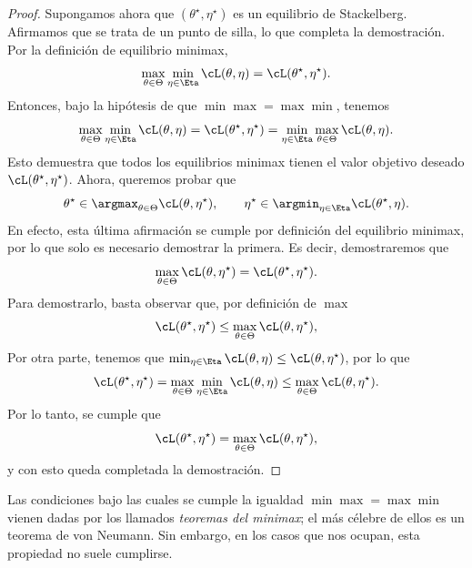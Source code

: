 \documentclass[../../book-main_es.tex]{subfiles}
\begin{document}
\begin{proof}
    Supongamos ahora que \((\theta^{\star}, \eta^{\star})\) es un equilibrio de Stackelberg.
    Afirmamos que se trata de un punto de silla, lo que completa
    la demostración. Por la definición de equilibrio minimax,
    \begin{equation}
        \max_{\theta \in \Theta}\min_{\eta \in \Eta}\cL(\theta, \eta)
        = \cL(\theta^{\star}, \eta^{\star}).
    \end{equation}
    Entonces, bajo la hipótesis de que \(\min\max = \max\min\), tenemos
    \begin{equation}
        \max_{\theta \in \Theta}\min_{\eta \in \Eta}\cL(\theta, \eta)
        = \cL(\theta^{\star}, \eta^{\star}) = \min_{\eta \in
        \Eta}\max_{\theta \in \Theta}\cL(\theta, \eta).
    \end{equation}
    Esto demuestra que todos los equilibrios minimax tienen el valor objetivo deseado
    \(\cL(\theta^{\star}, \eta^{\star})\). Ahora, queremos
    probar que
    \begin{equation}
        \theta^{\star} \in \argmax_{\theta \in \Theta}\cL(\theta,
        \eta^{\star}), \qquad \eta^{\star} \in \argmin_{\eta \in
        \Eta}\cL(\theta^{\star}, \eta).
    \end{equation}
    En efecto, esta última afirmación se cumple por definición del equilibrio minimax,
    por lo que solo es necesario demostrar la primera. Es decir, demostraremos que
    \begin{equation}
        \max_{\theta \in \Theta}\cL(\theta, \eta^{\star}) =
        \cL(\theta^{\star}, \eta^{\star}).
    \end{equation}
    Para demostrarlo, basta observar que, por definición de \(\max\)
    \begin{equation}
        \cL(\theta^{\star}, \eta^{\star}) \leq \max_{\theta \in
        \Theta}\cL(\theta, \eta^{\star}),
    \end{equation}
    Por otra parte, tenemos que \(\min_{\eta \in \Eta}\cL(\theta, \eta) \leq
    \cL(\theta, \eta^{\star})\), por lo que
    \begin{equation}
        \cL(\theta^{\star}, \eta^{\star}) = \max_{\theta \in
        \Theta}\min_{\eta \in \Eta}\cL(\theta, \eta) \leq
        \max_{\theta \in \Theta}\cL(\theta, \eta^{\star}).
    \end{equation}
    Por lo tanto, se cumple que
    \begin{equation}
        \cL(\theta^{\star}, \eta^{\star}) = \max_{\theta \in
        \Theta}\cL(\theta, \eta^{\star}),
    \end{equation}
    y con esto queda completada la demostración.
\end{proof}
Las condiciones bajo las cuales se cumple la igualdad \(\min\max = \max\min\)
vienen dadas por los llamados \textit{teoremas del minimax}; el más célebre
de ellos es un teorema de von Neumann. Sin embargo, en los casos que nos
ocupan, esta propiedad no suele cumplirse.
\end{document}
